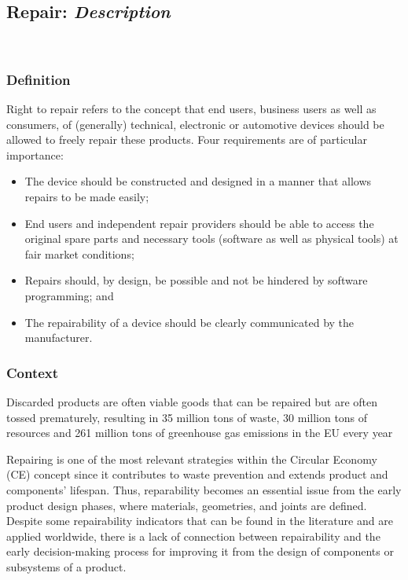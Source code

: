 \subsection{Repair: \textit{Description}}~\cite{cordella2021repairlca, wieser2018,svensson2018repair, hernandez2020repair, eu2019repair}

\subsubsection{Definition}
Right to repair refers to the concept that end users, business users as well as
consumers, of (generally) technical, electronic or automotive devices should be
allowed to freely repair these products. Four requirements are of particular
importance:

\begin{itemize}
    \item The device should be constructed and designed in a manner that allows repairs
          to be made easily;
    \item End users and independent repair providers should be able to access the original
          spare parts and necessary tools (software as well as physical tools) at fair
          market conditions;
    \item Repairs should, by design, be possible and not be hindered by software
          programming; and
    \item The repairability of a device should be clearly communicated by the
          manufacturer.
\end{itemize}




\subsubsection{Context}

Discarded products are often viable goods that can be repaired but are often
tossed prematurely, resulting in 35 million tons of waste, 30 million tons of
resources and 261 million tons of greenhouse gas emissions in the EU every
year~\cite{moeslinger2022repair}

Repairing is one of the most relevant strategies within the Circular Economy
(CE) concept since it contributes to waste prevention and extends product and
components' lifespan. Thus, reparability becomes an essential issue from the
early product design phases, where materials, geometries, and joints are
defined. Despite some repairability indicators that can be found in the
literature and are applied worldwide, there is a lack of connection between
repairability and the early decision-making process for improving it from the
design of components or subsystems of a product.


